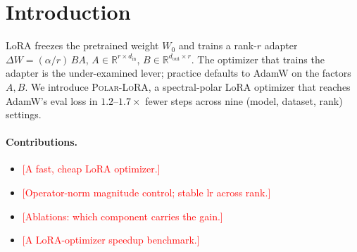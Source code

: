 \documentclass[11pt]{article}
\title{\methodname}  %
\author{}
\date{}
\newcommand{\R}{\mathbb{R}}
\newcommand{\DW}{\Delta W}
\newcommand{\methodname}{\textsc{Polar-LoRA}\xspace}
\newcommand{\PLACEHOLDER}[1]{\textcolor{red}{[#1]}}
\theoremstyle{plain}
\theoremstyle{definition}
\theoremstyle{remark}
\begin{document}
\maketitle

\begin{abstract}
\PLACEHOLDER{Abstract.}
\end{abstract}

\section{Introduction}
\label{sec:intro}
%

LoRA \cite{lora} freezes the pretrained weight $W_0$ and trains a rank-$r$ adapter
$\DW=(\alpha/r)\,BA$, $A\in\R^{r\times d_{\mathrm{in}}}$,
$B\in\R^{d_{\mathrm{out}}\times r}$. The optimizer that trains the adapter is the
under-examined lever; practice defaults to AdamW on the factors $A,B$. We introduce
\methodname{}, a spectral-polar LoRA optimizer that reaches AdamW's eval loss in
$1.2$--$1.7\times$ fewer steps across nine (model, dataset, rank) settings.

\paragraph{Contributions.}
\begin{itemize}[leftmargin=1.5em,itemsep=2pt,topsep=2pt]
  \item \PLACEHOLDER{A fast, cheap LoRA optimizer.}
  \item \PLACEHOLDER{Operator-norm magnitude control; stable lr across rank.}
  \item \PLACEHOLDER{Ablations: which component carries the gain.}
  \item \PLACEHOLDER{A LoRA-optimizer speedup benchmark.}
\end{itemize}

\end{document}
